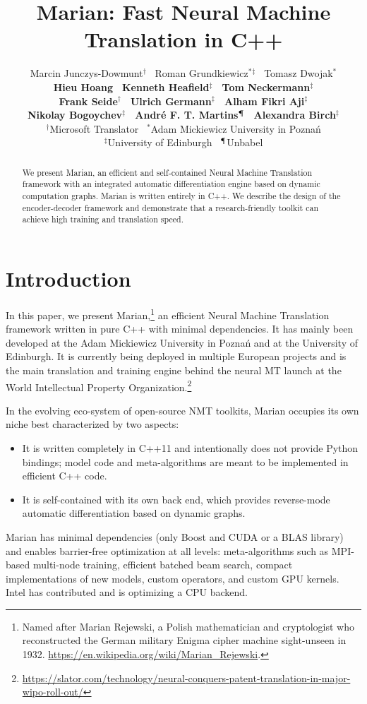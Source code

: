 \documentclass[11pt,a4paper]{article}
\title{Marian: Fast Neural Machine Translation in C++}
\author{Marcin Junczys-Dowmunt$^{\dagger}$ \, Roman Grundkiewicz$^{*}$$^{\ddagger}$ \, Tomasz Dwojak$^{*}$ \\ {\bf Hieu Hoang \, Kenneth Heafield$^{\ddagger}$ \, Tom Neckermann$^{\ddagger}$ }  \\  {\bf Frank Seide$^{\dagger}$ \, Ulrich Germann$^{\ddagger}$ \, Alham Fikri Aji$^{\ddagger}$ } \\ { \bf Nikolay Bogoychev$^{\ddagger}$ \, Andr\'{e} F. T. Martins$^{\mathparagraph}$ \, Alexandra Birch$^{\ddagger}$} \\[2mm]
  $^{\dagger}$Microsoft Translator \, $^{*}$Adam Mickiewicz University in Pozna\'{n} \\ $^{\ddagger}$University of Edinburgh \,  $^{\mathparagraph}$Unbabel }
\date{}
\begin{document}
  \maketitle
  \begin{abstract}
  We present Marian, an efficient and self-contained Neural Machine Translation framework with an integrated automatic differentiation engine based on dynamic computation graphs. Marian is written entirely in C++. We describe the design of the encoder-decoder framework and demonstrate that a research-friendly toolkit can achieve high training and translation speed.  
  \end{abstract}

  \section{Introduction}

  In this paper, we present Marian,\footnote{Named after Marian Rejewski, a Polish mathematician and cryptologist who reconstructed the German military Enigma cipher machine sight-unseen in 1932. \url{https://en.wikipedia.org/wiki/Marian_Rejewski}.} an efficient Neural Machine Translation framework written in pure C++ with minimal dependencies. It has mainly been developed at the Adam Mickiewicz University in Pozna\'{n} and at the University of Edinburgh. It is currently being deployed in multiple European projects and is the main translation and training engine behind the neural MT launch at the World Intellectual Property Organization.\footnote{\url{https://slator.com/technology/neural-conquers-patent-translation-in-major-wipo-roll-out/}}

  In the evolving eco-system of open-source NMT toolkits, Marian occupies its own niche best characterized by two aspects:
  \begin{itemize}
  \item It is written completely in C++11 and intentionally does not provide Python bindings; model code and meta-algorithms are meant to be implemented in efficient C++ code.
  \item It is self-contained with its own back end, which provides reverse-mode automatic differentiation based on dynamic graphs.
  \end{itemize}

  Marian has minimal dependencies (only Boost and CUDA or a BLAS library) and enables barrier-free optimization at all levels: meta-algorithms such as MPI-based multi-node training, efficient batched beam search, compact implementations of new models, custom operators, and custom GPU kernels. Intel has contributed and is optimizing a CPU backend. %
\end{document}
